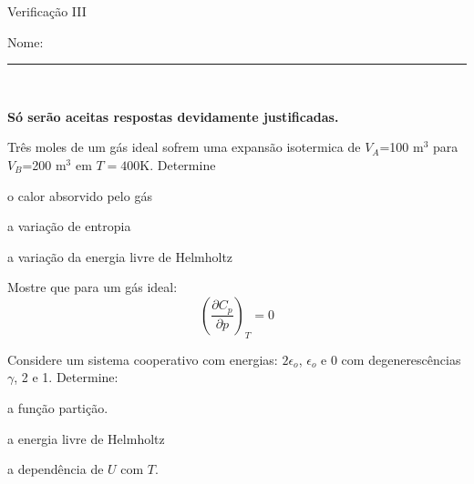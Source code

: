 \thispagestyle{headandfoot}
\begin{center} {\large Verificação III}
\end{center}
\vspace{0.5cm} Nome:\rule{14cm}{0.01cm} \\

\vspace{1 cm}
 
{\bf Só serão aceitas respostas devidamente justificadas.}

\vspace{1 cm}
\begin{questions}

\question[1.5] Três moles de um gás ideal sofrem uma expansão
isotermica de $V_A$=100 m$^3$ para $V_B$=200 m$^3$ em $T=400$K. Determine
\begin{parts}
\item o calor absorvido pelo gás
\item a variação de entropia
\item a variação da energia livre de Helmholtz
\end{parts}

\question[1.5] Mostre que para um gás ideal:
$$
\left(\frac{\partial C_p}{\partial p}\right)_T=0
$$

\question[1.5] Considere um sistema cooperativo com energias:
$2\epsilon_o$, $\epsilon_o$ e 0 com degenerescências $\gamma$, 2 e 1. 
Determine:
\begin{parts}
\item a função partição.
\item a energia livre de Helmholtz
\item a dependência de $U$ com $T$. 
\end{parts}

\end{questions}


